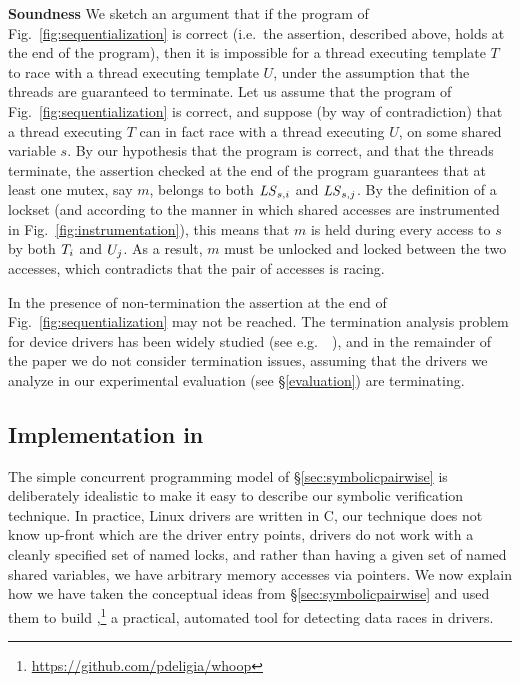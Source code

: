 \noindent\textbf{Soundness }
%
We sketch an argument that if the program of Fig.~\ref{fig:sequentialization} is correct (i.e.\ the assertion, described above, holds at the end of the program), then it is impossible for a thread executing template $T$ to race with a thread executing template $U$, under the assumption that the threads are guaranteed to terminate. Let us assume that the program of Fig.~\ref{fig:sequentialization} is correct, and suppose (by way of contradiction) that a thread executing $T$ can in fact race with a thread executing $U$, on some shared variable $s$.  By our hypothesis that the program is correct, and that the threads terminate, the assertion checked at the end of the program guarantees that at least one mutex, say $m$, belongs to both $\mathit{LS}_{s,i}$ and $\mathit{LS}_{s,j}$.  By the definition of a lockset (and according to the manner in which shared accesses are instrumented in Fig.~\ref{fig:instrumentation}), this means that $m$ is held during every access to $s$ by both $T_{i}$ and $U_{j}$. As a result, $m$ must be unlocked and locked between the two accesses, which contradicts that the pair of accesses is racing.

In the presence of non-termination the assertion at the end of Fig.~\ref{fig:sequentialization} may not be reached.  The termination analysis problem for device drivers has been widely studied (see e.g.\ ~\cite{cook2006termination}), and in the remainder of the paper we do not consider termination issues, assuming that the drivers we analyze in our experimental evaluation (see \S\ref{evaluation}) are terminating.

\subsection{Implementation in \whoop}
\label{sec:implementation}

The simple concurrent programming model of \S\ref{sec:symbolicpairwise} is deliberately idealistic to make it easy to describe our symbolic verification technique. In practice, Linux drivers are written in C, our technique does not know up-front which are the driver entry points, drivers do not work with a cleanly specified set of named locks, and rather than having a given set of named shared variables, we have arbitrary memory accesses via pointers. We now explain how we have taken the conceptual ideas from \S\ref{sec:symbolicpairwise} and used them to build \whoop,\footnote{\url{https://github.com/pdeligia/whoop}} a practical, automated tool for detecting data races in drivers.

